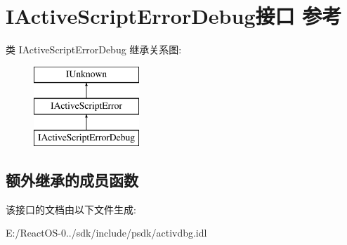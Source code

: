 \hypertarget{interface_i_active_script_error_debug}{}\section{I\+Active\+Script\+Error\+Debug接口 参考}
\label{interface_i_active_script_error_debug}
类 I\+Active\+Script\+Error\+Debug 继承关系图\+:\begin{figure}[H]
\begin{center}
\leavevmode
\includegraphics[height=3.000000cm]{interface_i_active_script_error_debug}
\end{center}
\end{figure}
\subsection*{额外继承的成员函数}


该接口的文档由以下文件生成\+:\begin{DoxyCompactItemize}
\item 
E\+:/\+React\+O\+S-\/0../sdk/include/psdk/activdbg.\+idl\end{DoxyCompactItemize}

